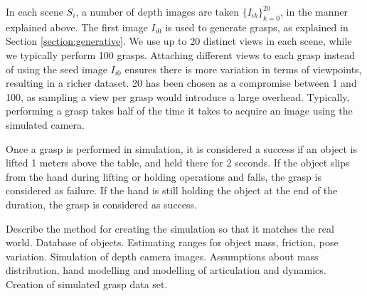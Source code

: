 In each scene $S_i$, a number of depth images are taken $\{I_{ik}\}_{k=0}^20$, in the manner explained above. The first image $I_{i0}$ is used to generate grasps, as explained in Section \ref{section:generative}. We use up to 20 distinct views in each scene, while we typically perform 100 grasps. Attaching different views to each grasp instead of using the seed image $I_{i0}$ ensures there is more variation in terms of viewpoints, resulting in a richer dataset. 20 has been chosen as a compromise between 1 and 100, as sampling a view per grasp would introduce a large overhead. Typically, performing a grasp takes half of the time it takes to acquire an image using the simulated camera.

Once a grasp is performed in simulation, it is considered a success if an object is lifted 1 meters above the table, and held there for 2 seconds. If the object slips from the hand during lifting or holding operations and falls, the grasp is considered as failure. If the hand is still holding the object at the end of the duration, the grasp is considered as success. 

Describe the method for creating the simulation so that it matches the real world. Database of objects. Estimating ranges for object mass, friction, pose variation. Simulation of depth camera images. Assumptions about mass distribution, hand modelling and modelling of articulation and dynamics. Creation of simulated grasp data set.

